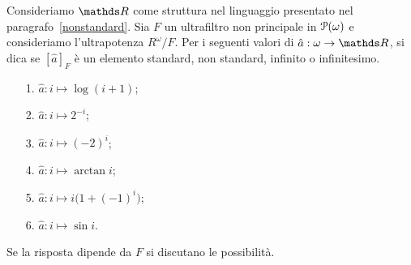 \begin{exercise}\label{ldjferif}
Consideriamo $\RR$ come struttura nel linguaggio presentato nel paragrafo~\ref{nonstandard}. Sia $F$ un ultrafiltro non principale in $\P(\omega)$ e consideriamo l'ultrapotenza $R^\omega/F$. Per i seguenti valori di $\hat a: \omega\to\RR$, si dica se $[\hat a]_F$ \`e un elemento standard, non standard, infinito o infinitesimo.

\begin{minipage}{.49\textwidth}
\begin{itemize}
\item[1.] $\displaystyle\hat a : i\mapsto \log (i+1)$;

\item[2.] $\displaystyle\hat a : i \mapsto 2^{-i}$;

\item[3.] $\displaystyle\hat a : i \mapsto (-2)^i$;
\end{itemize}
\end{minipage}
%
\begin{minipage}{.49\textwidth}
\begin{itemize}
\item[4.] $\displaystyle\hat a : i\mapsto \arctan i$;

\item[5.] $\displaystyle\hat a : i\mapsto i\big(1+(-1)^i\big)$;

\item[6.] $\displaystyle\hat a : i\mapsto \sin i$.
\end{itemize}
\end{minipage}

Se la risposta dipende da $F$ si discutano le possibilit\`a.\QED
\end{exercise}





